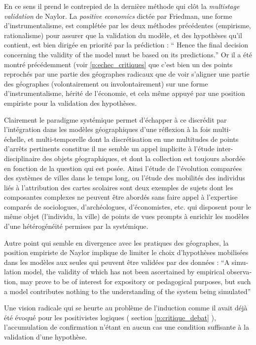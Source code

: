 En ce sens il prend le contrepied de la dernière méthode qui clôt la \textit{multistage validation} de Naylor. La \textit{positive economics} dictée par Friedman, une forme d'instrumentalisme, est complétée par les deux méthodes précédentes (empirisme, rationalisme) pour assurer que la validation du modèle, et des hypothèses qu'il contient, est bien dirigée en priorité par la prédiction : \foreignquote{english}{ Hence the final decision concerning the validity of the model must be based on its predictions.} \autocite[97]{Naylor1967} Or il a été montré précédemment (voir \ref{p:echec_critiques} que c'est bien un des points reprochés par une partie des géographes radicaux que de voir s'aligner une partie des géographes (volontairement ou involontairement) sur une forme d'instrumentalisme, hérité de l'économie, et cela même appuyé par une position empiriste pour la validation des hypothèses.

Clairement le paradigme systémique permet d'échapper à ce discrédit par l'intégration dans les modèles géographiques d'une réflexion à la fois multi-échelle, et multi-temporelle \autocite{Dastes2001a} dont la discrétisation en une multitudes de points d’arrêts pertinents constitue il me semble un appel implicite à l'étude inter-disciplinaire des objets géographiques, et dont la collection est toujours abordée en fonction de la question qui est posée. Ainsi l'étude de l'évolution comparées des systèmes de villes dans le temps long, ou l'étude des mobilités des individus liés à l'attribution des cartes scolaires sont deux exemples de sujets dont les composantes complexes ne peuvent être abordés sans faire appel à l'expertise comparés de sociologues, d'archéologues, d'économistes, etc. qui disposent pour le même objet (l'individu, la ville) de points de vues prompts à enrichir les modèles d'une hétérogénéité permises par la systémique.

Autre point qui semble en divergence avec les pratiques des géographes, la position empiriste de Naylor implique de limiter le choix d'hypothèses mobilisées dans les modèles aux seules qui peuvent être validées par des données : \foreignquote{english}{A simulation model, the validity of which has not been ascertained by empirical observation, may prove to be of interest for expository or pedagogical purposes, but such a model contributes nothing to the understanding of the system being simulated} \autocite{Naylor1967}

Une vision radicale qui se heurte au problème de l'induction comme il avait déjà été évoqué pour les positivistes logiques ( section \ref{p:critique_debat} ), l'accumulation de confirmation n'étant en aucun cas une condition suffisante à la validation d'une hypothèse.

